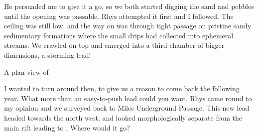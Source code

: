 He persuaded me to give it a go, so we both started digging the sand and pebbles until the opening was passable. Rhys attempted it first and I followed. The ceiling was still low, and the way on was through tight passage on pristine sandy sedimentary formations where the small drips had collected into ephemeral streams. We crawled on top and emerged into a third chamber of bigger dimensions, a storming lead! 

\begin{survey}[t!]
	\checkoddpage \ifoddpage \forcerectofloat \else \forceversofloat \fi
	\centering
	\caption[Lazarus (grade 1)]{A plan view of  -}
	\label{lazarus plan}
\end{survey}

I wanted to turn around then, to give us a reason to come back the following year. What more than an easy-to-push lead could you want. Rhys came round to my opinion and we surveyed back to Miles Underground Passage. This new lead headed towards the north west, and looked morphologically separate from the main rift leading to . Where would it go?





